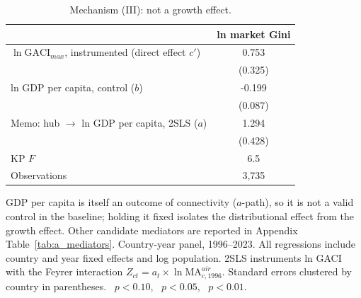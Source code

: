 \begin{table}[H]
\centering
\caption{Mechanism (III): not a growth effect.}
\label{tab:mech_C}
\begin{threeparttable}
\small
\begin{tabular}{lc}
\toprule
\midrule
 & ln market Gini \\
\midrule
$\ln\mathrm{GACI}_{max}$, instrumented (direct effect $c'$) & 0.753\sym{**} \\
 & (0.325) \\
ln GDP per capita, control ($b$) & -0.199\sym{**} \\
 & (0.087) \\
Memo: hub $\rightarrow$ ln GDP per capita, 2SLS ($a$) & 1.294\sym{***} \\
 & (0.428) \\
KP $F$ & 6.5 \\
Observations & 3{,}735 \\
\bottomrule
\end{tabular}
\begin{tablenotes}\small
\item GDP per capita is itself an outcome of connectivity ($a$-path), so it is not a valid control in the baseline; holding it fixed isolates the distributional effect from the growth effect. Other candidate mediators are reported in Appendix Table~\ref{tab:a_mediators}. Country-year panel, 1996--2023. All regressions include country and year fixed effects and log population. 2SLS instruments ln GACI with the Feyrer interaction $Z_{ct}=a_t\times\ln \mathrm{MA}^{air}_{c,1996}$. Standard errors clustered by country in parentheses. \sym{*}~$p<0.10$, \sym{**}~$p<0.05$, \sym{***}~$p<0.01$.
\end{tablenotes}
\end{threeparttable}
\end{table}

